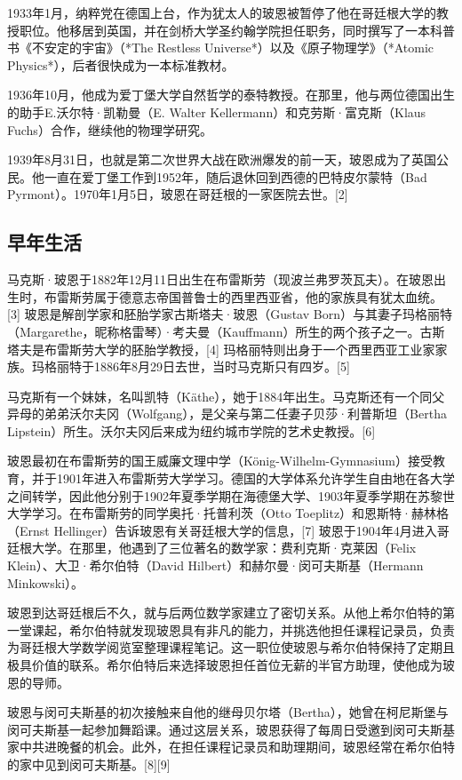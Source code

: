 1933年1月，纳粹党在德国上台，作为犹太人的玻恩被暂停了他在哥廷根大学的教授职位。他移居到英国，并在剑桥大学圣约翰学院担任职务，同时撰写了一本科普书《不安定的宇宙》（*The Restless Universe*）以及《原子物理学》（*Atomic Physics*），后者很快成为一本标准教材。

1936年10月，他成为爱丁堡大学自然哲学的泰特教授。在那里，他与两位德国出生的助手E.沃尔特·凯勒曼（E. Walter Kellermann）和克劳斯·富克斯（Klaus Fuchs）合作，继续他的物理学研究。

1939年8月31日，也就是第二次世界大战在欧洲爆发的前一天，玻恩成为了英国公民。他一直在爱丁堡工作到1952年，随后退休回到西德的巴特皮尔蒙特（Bad Pyrmont）。1970年1月5日，玻恩在哥廷根的一家医院去世。[2]
\subsection{早年生活}  
马克斯·玻恩于1882年12月11日出生在布雷斯劳（现波兰弗罗茨瓦夫）。在玻恩出生时，布雷斯劳属于德意志帝国普鲁士的西里西亚省，他的家族具有犹太血统。[3] 玻恩是解剖学家和胚胎学家古斯塔夫·玻恩（Gustav Born）与其妻子玛格丽特（Margarethe，昵称格雷琴）·考夫曼（Kauffmann）所生的两个孩子之一。古斯塔夫是布雷斯劳大学的胚胎学教授，[4] 玛格丽特则出身于一个西里西亚工业家家族。玛格丽特于1886年8月29日去世，当时马克斯只有四岁。[5]  

马克斯有一个妹妹，名叫凯特（Käthe），她于1884年出生。马克斯还有一个同父异母的弟弟沃尔夫冈（Wolfgang），是父亲与第二任妻子贝莎·利普斯坦（Bertha Lipstein）所生。沃尔夫冈后来成为纽约城市学院的艺术史教授。[6]
 
玻恩最初在布雷斯劳的国王威廉文理中学（König-Wilhelm-Gymnasium）接受教育，并于1901年进入布雷斯劳大学学习。德国的大学体系允许学生自由地在各大学之间转学，因此他分别于1902年夏季学期在海德堡大学、1903年夏季学期在苏黎世大学学习。在布雷斯劳的同学奥托·托普利茨（Otto Toeplitz）和恩斯特·赫林格（Ernst Hellinger）告诉玻恩有关哥廷根大学的信息，[7] 玻恩于1904年4月进入哥廷根大学。在那里，他遇到了三位著名的数学家：费利克斯·克莱因（Felix Klein）、大卫·希尔伯特（David Hilbert）和赫尔曼·闵可夫斯基（Hermann Minkowski）。  

玻恩到达哥廷根后不久，就与后两位数学家建立了密切关系。从他上希尔伯特的第一堂课起，希尔伯特就发现玻恩具有非凡的能力，并挑选他担任课程记录员，负责为哥廷根大学数学阅览室整理课程笔记。这一职位使玻恩与希尔伯特保持了定期且极具价值的联系。希尔伯特后来选择玻恩担任首位无薪的半官方助理，使他成为玻恩的导师。  

玻恩与闵可夫斯基的初次接触来自他的继母贝尔塔（Bertha），她曾在柯尼斯堡与闵可夫斯基一起参加舞蹈课。通过这层关系，玻恩获得了每周日受邀到闵可夫斯基家中共进晚餐的机会。此外，在担任课程记录员和助理期间，玻恩经常在希尔伯特的家中见到闵可夫斯基。[8][9]

